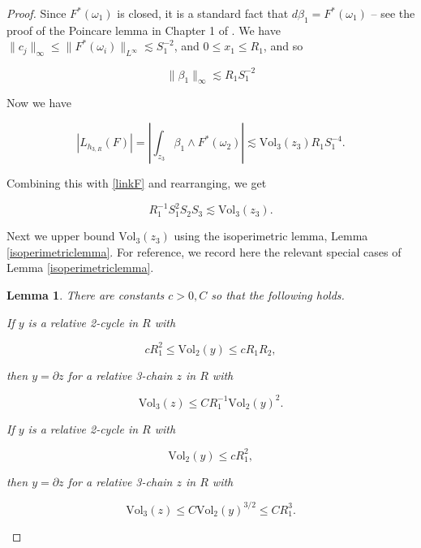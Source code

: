 \documentclass{amsart}
\newtheorem*{theorem 1}{Theorem 1}
\newtheorem*{theorem 2}{Theorem 2}
\newtheorem*{theorem 3}{Theorem 3}
\newtheorem{lemma}{Lemma}[section]
\numberwithin{equation}{section}
\newcommand{\Vol}{\textrm{Vol}}
\begin{document}
\begin{proof}
Since $F^*(\omega_1)$ is closed,  it is a standard fact that $d \beta_1 = F^*(\omega_1)$ -- see the proof of the Poincare lemma in Chapter 1 of \cite{BT}.    We have $\| c_j \|_\infty \le \|F^*(\omega_i) \|_{L^\infty} \lesssim S_1^{-2}$,  and $0 \le x_1 \le R_1$,  and so

\begin{equation} \label{betabound}
\| \beta_1 \|_{\infty} \lesssim R_1 S_1^{-2}
\end{equation}

Now we have

$$ |L_{h_{3,R}}(F)| = \left| \int_{z_3} \beta_1 \wedge F^*(\omega_2) \right| \lesssim \Vol_3(z_3) R_1 S_1^{-4}.  $$

Combining this with \eqref{linkF} and rearranging, we get

\begin{equation} \label{stepSz}  R_1^{-1} S_1^2 S_2 S_3 \lesssim \Vol_3(z_3).  \end{equation}

Next we upper bound $\Vol_3(z_3)$ using the isoperimetric lemma,  Lemma \ref{isoperimetriclemma}.   For reference,  we record here the relevant special cases of Lemma \ref{isoperimetriclemma}.   

\begin{lemma} \label{lemmaisoperimetric2} There are constants $c > 0, C$ so that the
following holds.

If $y$ is a relative 2-cycle in $R$ with 

\begin{equation} \label{casea} c R_1^2 \le \Vol_2(y) \le c R_1 R_2,  \end{equation}

then $y = \partial z$ for a relative 3-chain $z$ in $R$ with

\begin{equation} \label{bounda}  \Vol_3(z) \le C R_1^{-1} \Vol_2(y)^2.  \end{equation}

If $y$ is a relative 2-cycle in $R$ with

\begin{equation} \label{caseb} \Vol_2(y) \le c R_1^2,  \end{equation}

then $y = \partial z$ for a relative 3-chain $z$ in $R$ with

\begin{equation} \label{boundb}  \Vol_3(z) \le C \Vol_2(y)^{3/2} \le C R_1^3.  \end{equation}


\end{lemma}
\end{proof}
\end{document}
